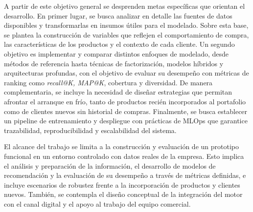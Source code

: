 A partir de este objetivo general se desprenden metas específicas que orientan el desarrollo. En primer lugar, se busca analizar en detalle las fuentes de datos disponibles y transformarlas en insumos útiles para el modelado. Sobre esta base, se plantea la construcción de variables que reflejen el comportamiento de compra, las características de los productos y el contexto de cada cliente. Un segundo objetivo es implementar y comparar distintos enfoques de modelado, desde métodos de referencia hasta técnicas de factorización, modelos híbridos y arquitecturas profundas, con el objetivo de evaluar su desempeño con métricas de ranking como \textit{recall@K, MAP@K}, cobertura y diversidad. De manera complementaria, se incluye la necesidad de diseñar estrategias que permitan afrontar el arranque en frío, tanto de productos recién incorporados al portafolio como de clientes nuevos sin historial de compras. Finalmente, se busca establecer un pipeline de entrenamiento y despliegue con prácticas de MLOps que garantice trazabilidad, reproducibilidad y escalabilidad del sistema.

El alcance del trabajo se limita a la construcción y evaluación de un prototipo funcional en un entorno controlado con datos reales de la empresa. Esto implica el análisis y preparación de la información, el desarrollo de modelos de recomendación y la evaluación de su desempeño a través de métricas definidas, e incluye escenarios de robustez frente a la incorporación de productos y clientes nuevos. También, se contempla el diseño conceptual de la integración del motor con el canal digital y el apoyo al trabajo del equipo comercial.




